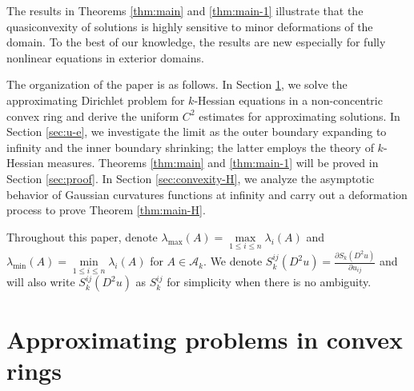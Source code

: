 \documentclass[reqno]{amsart}
\theoremstyle{remark}
\theoremstyle{definition}
\numberwithin{equation}{section}
\begin{document}
The results in Theorems \ref{thm:main} and \ref{thm:main-1} illustrate that the quasiconvexity of solutions is highly sensitive to minor deformations of the domain. To the best of our knowledge, the results are new especially for fully nonlinear equations in exterior domains.

The organization of the paper is as follows. In Section \ref{sec:u-e-R}, we solve the approximating Dirichlet problem
for $k$-Hessian equations in a non-concentric convex ring and derive the uniform $C^2$ estimates for approximating solutions. In Section \ref{sec:u-e}, we investigate the limit as the outer boundary expanding to infinity and the inner boundary shrinking; the latter employs the theory of $k$-Hessian measures. Theorems \ref {thm:main} and \ref{thm:main-1} will be proved in Section \ref{sec:proof}. In Section \ref{sec:convexity-H}, we analyze the asymptotic behavior of Gaussian curvatures functions at infinity and carry out a deformation process to prove Theorem \ref{thm:main-H}.  

Throughout this paper, denote $\lambda_{\text{max}}(A)=\max\limits_{1\leq i\leq n}\lambda_i(A)$ and $\lambda_{\text{min}}(A)=\min\limits_{1\leq i\leq n}\lambda_i(A)$ for $A\in\mathcal{A}_k$. We denote $S_k^{ij}(D^2u)=\frac{\partial S_k(D^2u)}{\partial u_{ij}}$ and will also write $S_k^{ij}(D^2u)$ as $S_k^{ij}$ for simplicity when there is no ambiguity.

\section{Approximating problems in convex rings}\label{sec:u-e-R}
\end{document}

